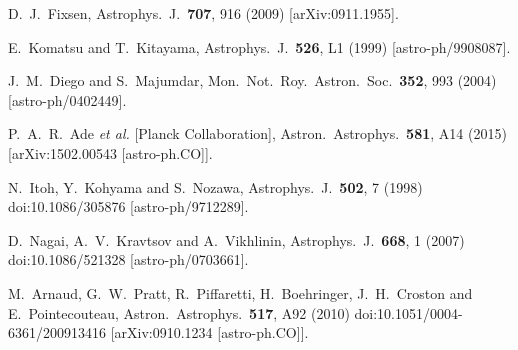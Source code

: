 \documentclass[aps,twocolumn,floats,prd,nofootinbib,10pt,floatfix]{revtex4-1}
\begin{document}
\begin{thebibliography}{99}
 D.~J.~Fixsen, 
    Astrophys.\ J.\ {\bf 707}, 916 (2009)
    [arXiv:0911.1955].

  E.~Komatsu and T.~Kitayama,
  Astrophys.\ J.\  {\bf 526}, L1 (1999)
  [astro-ph/9908087].


  J.~M.~Diego and S.~Majumdar,
  Mon.\ Not.\ Roy.\ Astron.\ Soc.\  {\bf 352}, 993 (2004)
  [astro-ph/0402449].


  P.~A.~R.~Ade {\it et al.} [Planck Collaboration],
  Astron.\ Astrophys.\  {\bf 581}, A14 (2015)
  [arXiv:1502.00543 [astro-ph.CO]].

  N.~Itoh, Y.~Kohyama and S.~Nozawa,
  Astrophys.\ J.\  {\bf 502}, 7 (1998)
  doi:10.1086/305876
  [astro-ph/9712289].

  D.~Nagai, A.~V.~Kravtsov and A.~Vikhlinin,
  Astrophys.\ J.\  {\bf 668}, 1 (2007)
  doi:10.1086/521328
  [astro-ph/0703661].

  M.~Arnaud, G.~W.~Pratt, R.~Piffaretti, H.~Boehringer, J.~H.~Croston and E.~Pointecouteau,
  Astron.\ Astrophys.\  {\bf 517}, A92 (2010)
  doi:10.1051/0004-6361/200913416
  [arXiv:0910.1234 [astro-ph.CO]].


\end{thebibliography}
\end{document}
